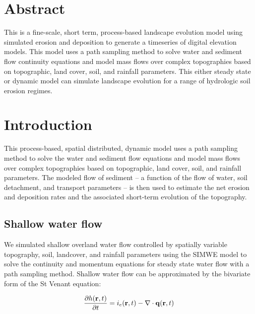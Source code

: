 \documentclass[10pt,letterpaper]{article}
\begin{document}
\section*{Abstract}

This is a fine-scale, short term, process-based landscape evolution model using simulated erosion and deposition to generate a timeseries of digital elevation models. This model uses a path sampling method to solve water and sediment flow continuity equations and model mass flows over complex topographies based on topographic, land cover, soil, and rainfall parameters. This either steady state or dynamic model can simulate landscape evolution for a range of hydrologic soil erosion regimes. 



\linenumbers

\section*{Introduction}

This process-based, spatial distributed, dynamic model uses a path sampling method to solve the water and sediment flow equations
\cite{mitasova2004}
and model mass flows over complex topographies based on topographic, land cover, soil, and rainfall parameters.
The modeled flow of sediment -- a function of the flow of water, soil detachment, and transport parameters -- is then used to estimate the net erosion and deposition rates and the associated short-term evolution of the topography.


\subsection*{Shallow water flow}

We simulated shallow overland water flow controlled by spatially variable topography, soil, landcover, and rainfall parameters using the SIMWE model to solve the continuity and momentum equations for steady state water flow with a path sampling method. 
%
Shallow water flow can be approximated by
the bivariate form of the St Venant equation:

\begin{equation}
\label{eq:water}
{\partial h({\bf r},t) \over \partial t} =
 i_e({\bf r},t) - \nabla \cdot {\bf q}({\bf r},t)
\end{equation}
\end{document}
